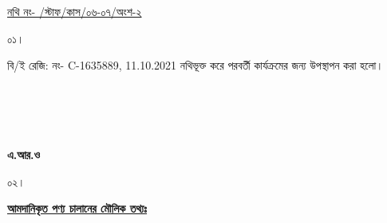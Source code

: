 \documentclass[11pt]{article}
\newcommand{\filenou}{\underline{নথি নং- \hspace{5em}/স্টাফ/কাস/০৬-০৭/অংশ-২}}
\newcommand{\beno}{C-1635889}
\newcommand{\bedt}{11.10.2021}
\begin{document}
\begin{minipage}[t]{0.56\linewidth}
\hspace{1em}
\end{minipage}
\begin{minipage}[t]{0.44\linewidth}
{\filenou}
\end{minipage}
\begin{minipage}[t]{0.05\linewidth}
০১।
\end{minipage}
\begin{minipage}[t]{1\linewidth}
বি/ই রেজি: নং- {\beno}, {\bedt}
নথিভূক্ত করে পরবর্তী কার্যক্রমের জন্য উপস্থাপন করা হলো।
\\
\\
\\
\\
\\
\end{minipage}
\begin{minipage}[t]{0.40\linewidth}
\hspace*{1em}
\end{minipage}
\begin{minipage}[t]{.60\linewidth}
\textbf{এ.আর.ও}
\\
\end{minipage}
\begin{minipage}[t]{0.05\linewidth}
০২।
\end{minipage}
\begin{minipage}[t]{0.35\linewidth}
\underline{\textbf{আমদানিকৃত পণ্য চালানের
মৌলিক তথ্যঃ}}
\end{minipage}
\end{document}
